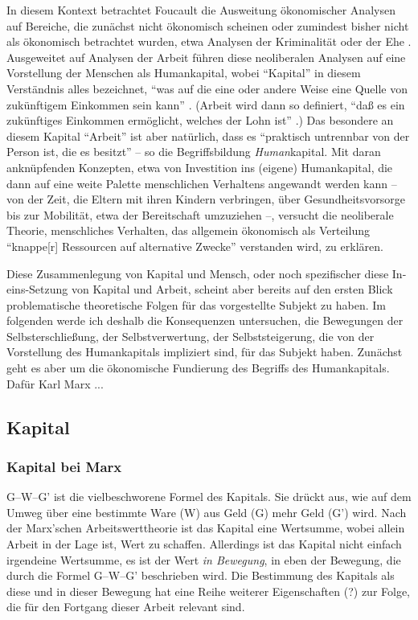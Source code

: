 \documentclass[12pt,
               DIV13,
               paper=a4,
               twoside=false,
               onehalfspacing,
               bibliography=totoc,
               toc=graduated,
               draft,
               ]{scrartcl}
\newcommand{\pc}[2]{\parencite[#1]{#2}}
\newcommand{\vgl}[2]{\parencite[vgl.][#1]{#2}}
\newcommand{\worries}[1]{\ifdraft{\textcolor{blue}{\texttt{(#1)}}}{}}
\newcommand{\gwg}{G--W--G'\xspace}
\begin{document}
In diesem Kontext betrachtet Foucault die Ausweitung ökonomischer
Analysen auf Bereiche, die zunächst nicht ökonomisch scheinen oder
zumindest bisher nicht als ökonomisch betrachtet wurden, etwa Analysen
der Kriminalität oder der Ehe \vgl{367}{gbp}. Ausgeweitet auf Analysen
der Arbeit führen diese neoliberalen Analysen auf eine Vorstellung der
Menschen als Humankapital, wobei "`Kapital"' in diesem Verständnis
alles bezeichnet, "`was auf die eine oder andere Weise eine Quelle von
zukünftigem Einkommen sein kann"' \pc{312}{gbp}. (Arbeit wird dann so
definiert, "`daß es ein zukünftiges Einkommen ermöglicht, welches der
Lohn ist"' \pc{312}{gbp}.) Das besondere an diesem Kapital "`Arbeit"'
ist aber natürlich, dass es "`praktisch untrennbar von der Person ist,
die es besitzt"' \pc{312}{gbp} -- so die Begriffsbildung
\emph{Human}kapital. Mit daran anknüpfenden Konzepten, etwa von
Investition ins (eigene) Humankapital, die dann auf eine weite Palette
menschlichen Verhaltens angewandt werden kann -- von der Zeit, die
Eltern mit ihren Kindern verbringen, über Gesundheitsvorsorge bis zur
Mobilität, etwa der Bereitschaft umzuziehen \vgl{320}{gbp} --,
versucht die neoliberale Theorie, menschliches Verhalten, das
allgemein ökonomisch als Verteilung "`knappe[r] Ressourcen auf
alternative Zwecke"' \pc{310}{gbp} verstanden wird, zu erklären.

Diese Zusammenlegung von Kapital und Mensch, oder noch spezifischer
diese In-eins-Set\-zung von Kapital und Arbeit, scheint aber bereits
auf den ersten Blick problematische theoretische \worries{und
praktische?} Folgen für das vorgestellte Subjekt zu haben. Im
folgenden werde ich deshalb die Konsequenzen untersuchen, die
Bewegungen der Selbsterschließung, der Selbstverwertung, der
Selbststeigerung, die von der Vorstellung des Humankapitals impliziert
sind, für das Subjekt haben. Zunächst geht es aber um die ökonomische
Fundierung des Begriffs des Humankapitals. Dafür Karl Marx ...

\worries{Warum Marx?}

\subsection{Kapital}

\subsubsection{Kapital bei Marx}

\gwg ist die vielbeschworene Formel des Kapitals. Sie drückt aus, wie
auf dem Umweg über eine bestimmte Ware (W) aus Geld (G) mehr Geld (G')
wird. Nach der Marx'schen Arbeitswerttheorie ist das Kapital eine
Wertsumme, wobei allein Arbeit in der Lage ist, Wert zu schaffen.
Allerdings ist das Kapital nicht einfach irgendeine Wertsumme, es ist
der Wert \emph{in Bewegung}, in eben der Bewegung, die durch die
Formel \gwg beschrieben wird. Die Bestimmung des Kapitals als diese
und in dieser Bewegung hat eine Reihe weiterer Eigenschaften (?) zur
Folge, die für den Fortgang dieser Arbeit relevant sind.
\end{document}
